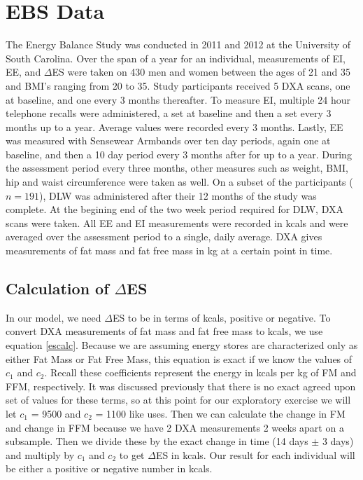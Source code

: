 \documentclass[11pt]{article}\usepackage[]{graphicx}\usepackage[]{color}
\begin{document}
\section{EBS Data}
The Energy Balance Study \cite{hand} was conducted in 2011 and 2012 at the University of South Carolina. Over the span of a year for an individual, measurements of EI, EE, and $\Delta$ES were taken on 430 men and women between the ages of 21 and 35 and BMI's ranging from 20 to 35. Study participants received 5 DXA scans, one at baseline, and one every 3 months thereafter. To measure EI, multiple 24 hour telephone recalls were administered, a set at baseline and then a set every 3 months up to a year. Average values were recorded every 3 months. Lastly, EE was measured with Sensewear Armbands over ten day periods, again one at baseline, and then a 10 day period every 3 months after for up to a year. During the assessment period every three months, other measures such as weight, BMI, hip and waist circumference were taken as well. On a subset of the participants ($n=191$), DLW was administered after their 12 months of the study was complete. At the begining end of the two week period required for DLW, DXA scans were taken. All EE and EI measurements were recorded in kcals and were averaged over the assessment period to a single, daily average. DXA gives measurements of fat mass and fat free mass in kg at a certain point in time. 

\subsection{Calculation of $\Delta$ES}

In our model, we need $\Delta$ES to be in terms of kcals, positive or negative. To convert DXA measurements of fat mass and fat free mass to kcals, we use equation \eqref{escalc}. Because we are assuming energy stores are characterized only as either Fat Mass or Fat Free Mass, this equation is exact if we know the values of $c_1$ and $c_2$. Recall these coefficients represent the energy in kcals per kg of FM and FFM, respectively. It was discussed previously that there is no exact agreed upon set of values for these terms, so at this point for our exploratory exercise we will let $c_1$ = 9500 and $c_2$ = 1100 like \cite{thomas11} uses. Then we can calculate the change in FM and change in FFM because we have 2 DXA measurements 2 weeks apart on a subsample. Then we divide these by the exact change in time (14 days $\pm$ 3 days) and multiply by $c_1$ and $c_2$ to get $\Delta$ES in kcals. Our result for each individual will be either a positive or negative number in kcals.
\end{document}
